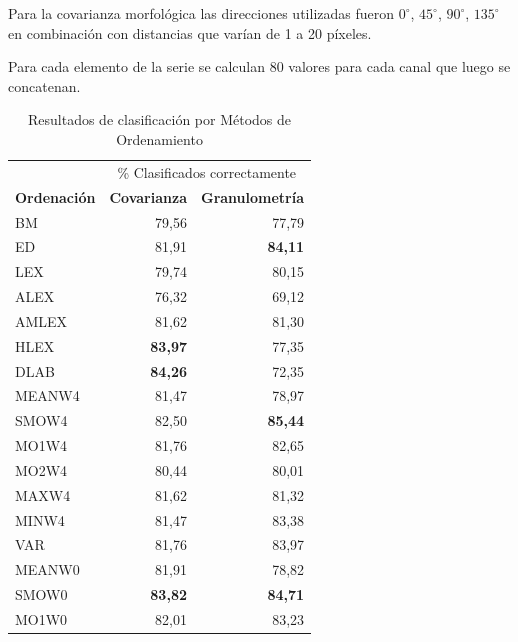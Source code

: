 Para la covarianza morfológica las direcciones utilizadas fueron $0^{\circ}$, $45^{\circ}$, $90^{\circ}$, $135^{\circ}$ en combinación con distancias que varían de 1 a 20 píxeles.

Para cada elemento de la serie se calculan 80 valores para cada canal que luego se concatenan.
\begin{table}
\caption{ Resultados de clasificación por Métodos de Ordenamiento}
\label{tab:experiment1_t1}

\begin{tabular}{@{}lrr@{}}
\toprule
&\multicolumn{2}{c}{ \% Clasificados correctamente }\\
\cline{2-3}
\textbf{Ordenación } & \textbf{Covarianza} &\textbf{Granulometría } \\ 
\cmidrule{1-3}
BM & 79,56 & 77,79 \\ \hline
ED & 81,91 & \textbf{84,11}  \\ \hline
LEX & 79,74 & 80,15 \\ \hline
ALEX & 76,32   &  69,12  \\ \hline
AMLEX &  81,62   &  81,30  \\ \hline
HLEX &  \textbf{83,97}  &  77,35  \\ \hline
DLAB  & \textbf{84,26}  & 72,35   \\ \hline
MEANW4 & 81,47 & 78,97 \\ \hline %
SMOW4 & 82,50 & \textbf{85,44} \\ \hline %
MO1W4 & 81,76 & 82,65 \\ \hline %
MO2W4 & 80,44 & 80,01 \\ \hline %
MAXW4 & 81,62 & 81,32 \\ \hline %
MINW4 & 81,47 & 83,38 \\ \hline %
VAR   & 81,76 &  83,97  \\ \hline 
MEANW0 & 81,91 & 78,82 \\ \hline %
SMOW0 & \textbf{83,82} & \textbf{84,71} \\ \hline %
MO1W0 & 82,01  & 83,23  \\ \hline %

\end{tabular}
\end{table}
